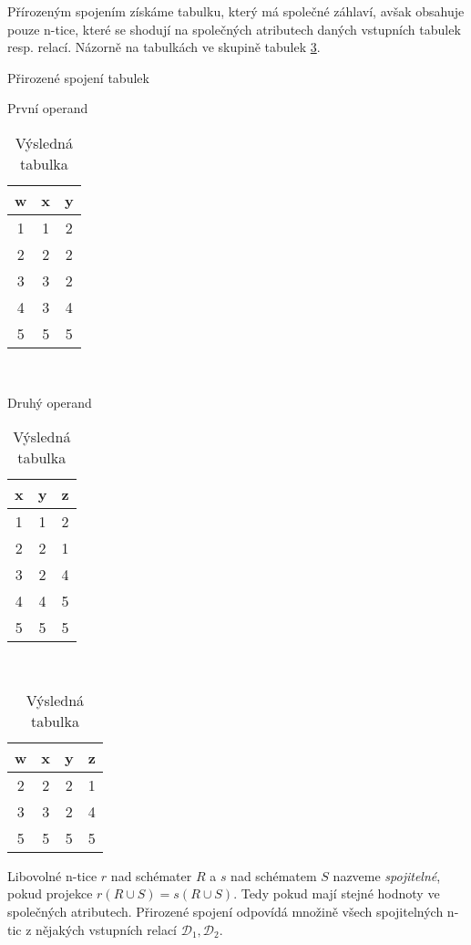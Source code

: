 \begin{upexample}
Přírozeným spojením získáme tabulku, který má společné záhlaví, avšak obsahuje pouze n-tice, které se shodují na společných atributech daných vstupních tabulek resp. relací. Názorně na tabulkách ve skupině tabulek \ref{tab:prir_spojeni}.
\begin{table}
\caption{Přirozené spojení tabulek}\label{tab:prir_spojeni}
\begin{subtable}[t]{0.3\textwidth}
\centering
\caption{První operand}
\begin{tabular}{c | c | c}
w & x & y \\
\hline
1 & 1 & 2 \\
2 & \cellcolor{red}2 & \cellcolor{red}2 \\
3 & \cellcolor{yellow}3 & \cellcolor{yellow}2 \\
4 & 3 & 4 \\
5 & \cellcolor{green}5 & \cellcolor{green}5
\end{tabular}
\end{subtable}
~
\begin{subtable}[t]{0.3\textwidth}
\centering
\caption{Druhý operand}
\begin{tabular}{c | c | c}
x & y & z \\
\hline
1 & 1 & 2 \\
\cellcolor{red}2 & \cellcolor{red}2 & 1 \\
\cellcolor{yellow}3 & \cellcolor{yellow}2 & 4 \\
4 & 4 & 5 \\
\cellcolor{green}5 & \cellcolor{green}5 & 5
\end{tabular}
\end{subtable}
~
\begin{subtable}[t]{0.3\textwidth}
\centering
\caption{Výsledná tabulka}
\begin{tabular}{c | c | c | c}
w & x & y & z \\
\hline
2 & \cellcolor{red}2 & \cellcolor{red}2 & 1 \\
3 & \cellcolor{yellow}3 & \cellcolor{yellow}2 & 4 \\
5 & \cellcolor{green}5 & \cellcolor{green}5 & 5
\end{tabular}
\end{subtable}
\end{table}
\end{upexample}
Libovolné n-tice $r$ nad schémater $R$ a $s$ nad schématem $S$ nazveme \textit{spojitelné}, pokud projekce $r (R \cup S) = s (R \cup S)$. Tedy pokud mají stejné hodnoty ve společných atributech. Přirozené spojení odpovídá množině všech spojitelných n-tic z nějakých vstupních relací $\mathcal{D}_{1}, \mathcal{D}_{2}$.
